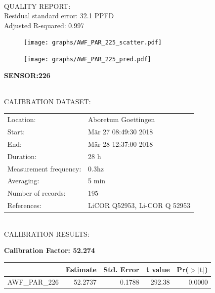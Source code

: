 \documentclass[oneside]{report}
\begin{document}
\hrulefill\\
QUALITY REPORT:\\
Residual standard error: 32.1 PPFD\\
Adjusted R-squared: 0.997



\begin{figure}[H]
  \centering
  \texttt{[image: graphs/AWF\_PAR\_225\_scatter.pdf]}
\end{figure}




\begin{figure}[H]
  \centering
  \texttt{[image: graphs/AWF\_PAR\_225\_pred.pdf]}
\end{figure}

\pagebreak


\begin{center}
\large{\textbf{SENSOR:226}}\\
\end{center}

\hrulefill\\
CALIBRATION DATASET:\\
\begin{table}[h!]
  \centering
  \label{tab:table1}
  \begin{tabular}{ll}
    Location: & Aboretum Goettingen\\ 
    
    
    Start:  & Mär 27 08:49:30 2018 \\
    End:   & Mär 28 12:37:00 2018\\ 
    Duration: & 28 h\\
    Measurement frequency: & 0.3hz\\
    Averaging:  &5 min\\
    Number of records: & 195 \\
    References: & LiCOR Q52953, Li-COR Q 52953 \\
  \end{tabular}
\end{table}

\hrulefill\\
CALIBRATION RESULTS:\\


\begin{center}
\textbf{\large{Calibration Factor: 52.274}}\\
\end{center}
\begin{table}[ht]
\centering
\begin{tabular}{rrrrr}
  \hline
 & Estimate & Std. Error & t value & Pr($>$$|$t$|$) \\ 
  \hline
AWF\_PAR\_226 & 52.2737 & 0.1788 & 292.38 & 0.0000 \\ 
   \hline
\end{tabular}
\end{table}
\end{document}
